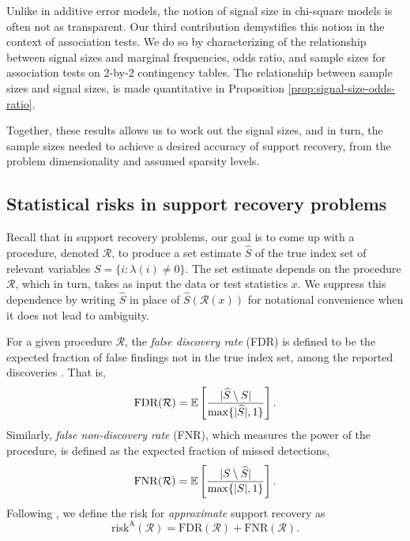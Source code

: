 Unlike in additive error models, the notion of signal size in chi-square models is often not as transparent.
Our third contribution demystifies this notion in the context of association tests.
We do so by characterizing of the relationship between signal sizes and marginal frequencies, odds ratio, and sample sizes for association tests on 2-by-2 contingency tables.
The relationship between sample sizes and signal sizes, is made quantitative in Proposition \ref{prop:signal-size-odds-ratio}.

Together, these results allows us to work out the signal sizes, and in turn, the sample sizes needed to achieve a desired accuracy of support recovery, from the problem dimensionality and assumed sparsity levels.

\subsection{Statistical risks in support recovery problems}
\label{subsec:risks}

Recall that in support recovery problems, our goal is to come up with a procedure, denoted $\mathcal R$, to produce a set estimate $\widehat{S}$ of the true index set of relevant variables  $S=\{i:\lambda(i)\neq 0\}$.
The set estimate depends on the procedure $\mathcal{R}$, which in turn, takes as input the data or test statistics $x$.
We suppress this dependence by writing $\widehat{S}$ in place of $\widehat{S}(\mathcal{R}(x))$ for notational convenience when it does not lead to ambiguity.

For a given procedure $\mathcal{R}$, the \emph{false discovery rate} (FDR) is defined to be the expected fraction of false findings not in the true index set, among the reported discoveries \cite{benjamini1995controlling}. That is,
\begin{equation} \label{eq:FDR}
    \mathrm{FDR}(\mathcal{R}) = \E\left[\frac{|\widehat{S}\setminus S|}{\max\{|\widehat{S}|,1\}}\right].
\end{equation}
Similarly, \emph{false non-discovery rate} (FNR), which measures the power of the procedure, is defined as the expected fraction of missed detections,
\begin{equation} \label{eq:FNR}
    \mathrm{FNR}(\mathcal{R}) = \E\left[\frac{|S\setminus \widehat{S}|}{\max\{|{S}|,1\}}\right].
\end{equation}
Following \cite{arias2017distribution, rabinovich2017optimal}, we define the risk for \emph{approximate} support recovery as
\begin{equation} \label{eq:risk-approximate}
    \mathrm{risk}^{\mathrm{A}}(\mathcal{R}) = \mathrm{FDR}(\mathcal{R}) + \mathrm{FNR}(\mathcal{R}).
\end{equation}

